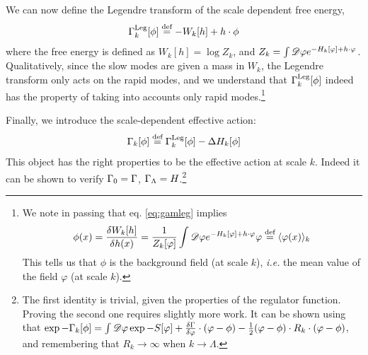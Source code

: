 We can now define the Legendre transform of the scale dependent free energy,
\begin{equation}
\label{eq:gamleg}
\Gamma_k^{\text{Leg}}[\phi]  \overset{\text{def}}{=}  - W_k[h] + h \cdot \phi
\end{equation}
where the free energy is defined as $W_k[h] = \log Z_k$, and $Z_k = \int  \mathscr{D}  \varphi e^{-H_k[\varphi] + h \cdot \varphi} $.
Qualitatively, since the slow modes are given a mass in $W_k$, the Legendre transform only acts on the rapid modes, and we understand that  $\Gamma_k^{\text{Leg}}[\phi]$ indeed has the property of taking into accounts only rapid modes.\footnote{We note in passing that eq. \eqref{eq:gamleg} implies 
\begin{equation}
\phi(x) = \frac{\delta W_k[h]}{
\delta h(x)} = \frac{1}{Z_k[\varphi]} \int  \mathscr{D}  \varphi e^{-H_k[\varphi] + h \cdot \varphi} \varphi  \overset{\text{def}}{=}  \langle \varphi(x) \rangle_k
\end{equation}
This tells us that $\phi$ is the background field (at scale $k$), \textit{i.e.} the mean value of the field $\varphi$ (at scale $k$). }

Finally, we introduce the scale-dependent effective action:
\begin{equation}
\Gamma_k[\phi]  \overset{\text{def}}{=}  \Gamma_k^{\text{Leg}}[\phi] - \Delta H_k[\phi]
\end{equation}
This object has the right properties to be the effective action at scale $k$. Indeed it can be shown to verify $\Gamma_0 = \Gamma$, $\Gamma_\Lambda = H$.\footnote{The first identity is trivial, given the properties of the regulator function. Proving the second one requires slightly more work. It can be shown using that $\exp{-\Gamma_k[\phi]} = \int  \mathscr{D}  \varphi \exp{-S[\varphi] + \frac{\delta \Gamma}{\delta \varphi} \cdot (\varphi - \phi) - \frac{1}{2} (\varphi - \phi ) \cdot R_k \cdot (\varphi - \phi) }$, and remembering that $R_k \rightarrow \infty$ when $k \rightarrow \Lambda$.}


